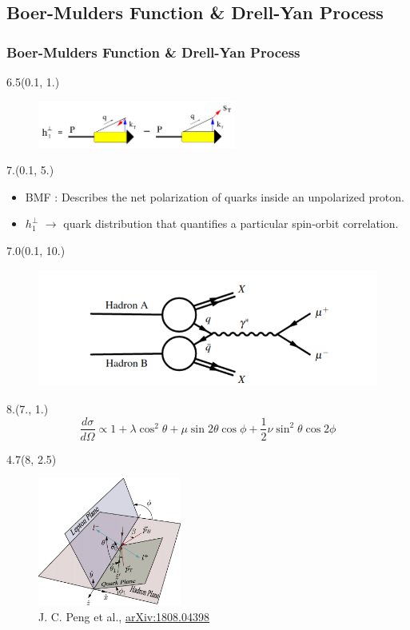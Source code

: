 \documentclass[12pt, xcolor={dvipsnames}, aspectratio = 169, sans, mathserif]{beamer}
\newenvironment{List}[2]
{\begin{textblock}{#1}#2
\begin{itemize}}
{\end{itemize}
\end{textblock}}
\newenvironment{Pic}[2]
{\begin{textblock}{#1}#2
\begin{figure}}
{\end{figure}
\end{textblock}}
\newcommand{\NewCaption}[3]{\caption{{#1}, \textcolor{blue}{\href{#2}{#3}}}}
\begin{document}
\subsection{Boer-Mulders Function \& Drell-Yan Process}

\begin{frame}
\frametitle{Boer-Mulders Function \& Drell-Yan Process}

\begin{Pic}{6.5}{(0.1, 1.)}
  \includegraphics[width=6.5cm]{imgs/BMF.png}
\end{Pic}

\begin{List}{7.}{(0.1, 5.)}

  \item BMF : Describes the net polarization of quarks inside an unpolarized proton.

  \item $h_{1}^{\perp}$ $\rightarrow$ quark distribution that quantifies a particular spin-orbit correlation.

\end{List}

\begin{Pic}{7.0}{(0.1, 10.)}
  \includegraphics[width=7.cm]{imgs/drell-yan.png}
\end{Pic}

\begin{textblock}{8.}(7., 1.)
\begin{equation*}
\frac{d\sigma}{d\Omega} \propto 1  + \lambda \cos^{2}\theta + \mu \sin 2 \theta \cos \phi + \frac{1}{2}\nu \sin^{2}\theta \cos 2 \phi
\end{equation*}
\end{textblock}

\begin{Pic}{4.7}{(8, 2.5)}
  \NewCaption{J. C. Peng et al.}{https://arxiv.org/abs/1808.04398}{arXiv:1808.04398}
  \includegraphics[width=4.7cm]{imgs/three_plane_newest.png}
\end{Pic}


\end{frame}
\end{document}
